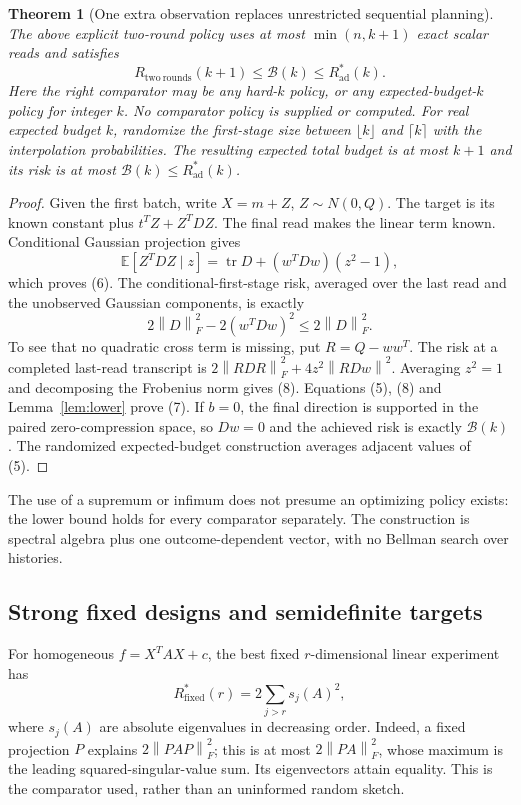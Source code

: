 \documentclass[11pt,a4paper]{article}
\newcommand{\E}{\mathbb E}\newcommand{\Var}{\operatorname{Var}}
\newcommand{\tr}{\operatorname{tr}}\newcommand{\rank}{\operatorname{rank}}
\newcommand{\norm}[1]{\left\lVert#1\right\rVert}
\newcommand{\Rad}{R^*_{\mathrm{ad}}}
\newtheorem{theorem}{Theorem}\newtheorem{lemma}[theorem]{Lemma}
\begin{document}
\begin{theorem}[One extra observation replaces unrestricted sequential planning]\label{thm:main}
The above explicit two-round policy uses at most $\min(n,k+1)$ exact scalar reads and satisfies
\[
 \boxed{R_{\mathrm{two\ rounds}}(k+1)
          \le\mathcal B(k)\le\Rad(k).} \tag{7}
\]
Here the right comparator may be any hard-$k$ policy, or any expected-budget-$k$ policy for integer $k$. No comparator policy is supplied or computed. For real expected budget $k$, randomize the first-stage size between $\lfloor k\rfloor$ and $\lceil k\rceil$ with the interpolation probabilities. The resulting expected total budget is at most $k+1$ and its risk is at most $\mathcal B(k)\le\Rad(k)$.
\end{theorem}
\begin{proof}
Given the first batch, write $X=m+Z$, $Z\sim N(0,Q)$. The target is its known constant plus $t^TZ+Z^TDZ$. The final read makes the linear term known. Conditional Gaussian projection gives
\[
 \E[Z^TDZ\mid z]=\tr D+(w^TDw)(z^2-1),
\]
which proves (6). The conditional-first-stage risk, averaged over the last read and the unobserved Gaussian components, is exactly
\[
 2\norm D_F^2-2(w^TDw)^2\le 2\norm D_F^2. \tag{8}
\]
To see that no quadratic cross term is missing, put $R=Q-ww^T$. The risk at a completed last-read transcript is
$2\norm{RDR}_F^2+4z^2\norm{RDw}^2$.
Averaging $z^2=1$ and decomposing the Frobenius norm gives (8).
Equations (5), (8) and Lemma~\ref{lem:lower} prove (7). If $b=0$, the final direction is supported in the paired zero-compression space, so $Dw=0$ and the achieved risk is exactly $\mathcal B(k)$. The randomized expected-budget construction averages adjacent values of (5).
\end{proof}

The use of a supremum or infimum does not presume an optimizing policy exists: the lower bound holds for every comparator separately. The construction is spectral algebra plus one outcome-dependent vector, with no Bellman search over histories.

\subsection{Strong fixed designs and semidefinite targets}

For homogeneous $f=X^TAX+c$, the best fixed $r$-dimensional linear experiment has
\[
 R_{\mathrm{fixed}}^*(r)=2\sum_{j>r}s_j(A)^2, \tag{9}
\]
where $s_j(A)$ are absolute eigenvalues in decreasing order. Indeed, a fixed projection $P$ explains $2\norm{PAP}_F^2$; this is at most $2\norm{PA}_F^2$, whose maximum is the leading squared-singular-value sum. Its eigenvectors attain equality. This is the comparator used, rather than an uninformed random sketch.
\end{document}

